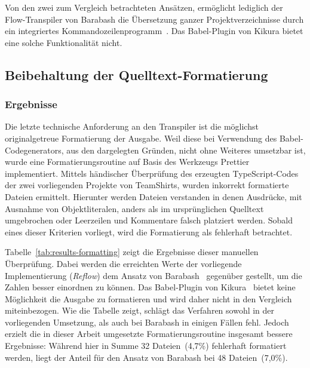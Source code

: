 Von den zwei zum Vergleich betrachteten Ansätzen, ermöglicht lediglich der Flow-Transpiler von Barabash die Übersetzung ganzer Projektverzeichnisse durch ein integriertes Kommandozeilenprogramm~\autocite{BARABASH:FLOW_TO_TS}. Das Babel-Plugin von Kikura bietet eine solche Funktionalität nicht.

\subsection{Beibehaltung der Quelltext-Formatierung}
\label{sec:results-formatting}

\subsubsection{Ergebnisse}

Die letzte technische Anforderung an den Transpiler ist die möglichst originalgetreue Formatierung der Ausgabe. Weil diese bei Verwendung des Babel-Codegenerators, aus den dargelegten Gründen, nicht ohne Weiteres umsetzbar ist, wurde eine Formatierungsroutine auf Basis des Werkzeugs Prettier~\autocite{SOFTWARE:PRETTIER} implementiert. Mittels händischer Überprüfung des erzeugten TypeScript-Codes der zwei vorliegenden Projekte von TeamShirts, wurden inkorrekt formatierte Dateien ermittelt. Hierunter werden Dateien verstanden in denen Ausdrücke, mit Ausnahme von Objektliteralen, anders als im ursprünglichen Quelltext umgebrochen oder Leerzeilen und Kommentare falsch platziert werden. Sobald eines dieser Kriterien vorliegt, wird die Formatierung als fehlerhaft betrachtet.

Tabelle~\ref{tab:results-formatting} zeigt die Ergebnisse dieser manuellen Überprüfung. Dabei werden die erreichten Werte der vorliegende Implementierung (\textit{Reflow}) dem Ansatz von Barabash~\autocite{BARABASH:FLOW_TO_TS} gegenüber gestellt, um die Zahlen besser einordnen zu können. Das Babel-Plugin von Kikura~\autocite{KIKURA:FLOW_TO_TS} bietet keine Möglichkeit die Ausgabe zu formatieren und wird daher nicht in den Vergleich miteinbezogen.
Wie die Tabelle zeigt, schlägt das Verfahren sowohl in der vorliegenden Umsetzung, als auch bei Barabash in einigen Fällen fehl. Jedoch erzielt die in dieser Arbeit umgesetzte Formatierungsroutine insgesamt bessere Ergebnisse: Während hier in Summe 32 Dateien~(4,7\%) fehlerhaft formatiert werden, liegt der Anteil für den Ansatz von Barabash bei 48 Dateien~(7,0\%).

\medbreak


